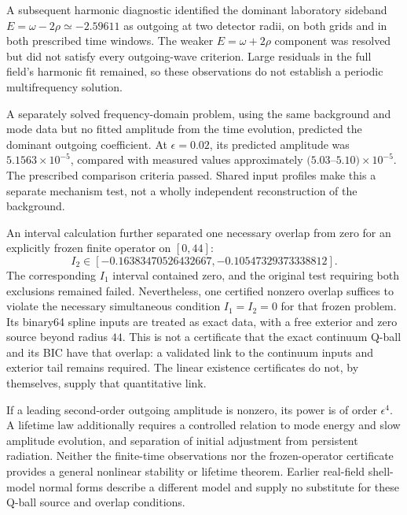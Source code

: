 A subsequent harmonic diagnostic identified the dominant laboratory
sideband $E=\omega-2\rho\simeq-2.59611$ as outgoing at two detector
radii, on both grids and in both prescribed time windows. The weaker
$E=\omega+2\rho$ component was resolved but did not satisfy every
outgoing-wave criterion. Large residuals in the full field's harmonic
fit remained, so these observations do not establish a periodic
multifrequency solution.

A separately solved frequency-domain problem, using the same background
and mode data but no fitted amplitude from the time evolution, predicted
the dominant outgoing coefficient. At $\epsilon=0.02$, its predicted
amplitude was $5.1563\times10^{-5}$, compared with measured values
approximately $(5.03$--$5.10)\times10^{-5}$. The prescribed comparison
criteria passed. Shared input profiles make this a separate mechanism
test, not a wholly independent reconstruction of the background.

An interval calculation further separated one necessary overlap from
zero for an explicitly frozen finite operator on $[0,44]$:
\begin{equation}
 I_2\in[-0.16383470526432667,-0.10547329373338812].
 \label{nl:frozen}
\end{equation}
The corresponding $I_1$ interval contained zero, and the original test
requiring both exclusions remained failed. Nevertheless, one certified
nonzero overlap suffices to violate the necessary simultaneous condition
$I_1=I_2=0$ for that frozen problem. Its binary64 spline inputs are treated
as exact data, with a free exterior and zero source beyond radius $44$.
This is not a certificate that the exact continuum Q-ball and its BIC
have that overlap: a validated link to the continuum inputs and exterior
tail remains required. The linear existence certificates do not, by
themselves, supply that quantitative link.

If a leading second-order outgoing amplitude is nonzero, its power is
of order $\epsilon^4$. A lifetime law additionally requires a controlled
relation to mode energy and slow amplitude evolution, and separation of
initial adjustment from persistent radiation. Neither the finite-time
observations nor the frozen-operator certificate provides a general
nonlinear stability or lifetime theorem. Earlier real-field shell-model
normal forms describe a different model and supply no substitute for
these Q-ball source and overlap conditions.

